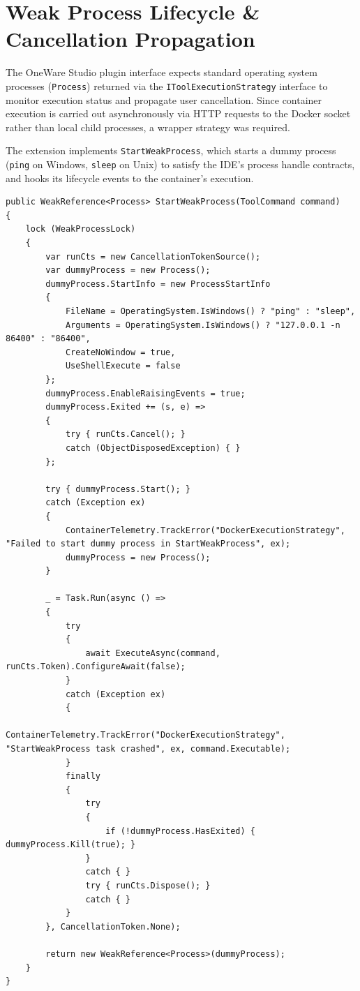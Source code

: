 \section{Weak Process Lifecycle \& Cancellation Propagation}
The OneWare Studio plugin interface expects standard operating system processes (\texttt{Process}) returned via the \texttt{ITool\-Execution\-Strategy} interface to monitor execution status and propagate user cancellation. Since container execution is carried out asynchronously via HTTP requests to the Docker socket rather than local child processes, a wrapper strategy was required.

The extension implements \texttt{StartWeakProcess}, which starts a dummy process (\texttt{ping} on Windows, \texttt{sleep} on Unix) to satisfy the IDE's process handle contracts, and hooks its lifecycle events to the container's execution.

\begin{lstlisting}[language=CSharp, caption={Weak Process Lifecycle Wrapper}, label={lst:weakprocess}]
public WeakReference<Process> StartWeakProcess(ToolCommand command)
{
    lock (WeakProcessLock)
    {
        var runCts = new CancellationTokenSource();
        var dummyProcess = new Process();
        dummyProcess.StartInfo = new ProcessStartInfo
        {
            FileName = OperatingSystem.IsWindows() ? "ping" : "sleep",
            Arguments = OperatingSystem.IsWindows() ? "127.0.0.1 -n 86400" : "86400",
            CreateNoWindow = true,
            UseShellExecute = false
        };
        dummyProcess.EnableRaisingEvents = true;
        dummyProcess.Exited += (s, e) =>
        {
            try { runCts.Cancel(); }
            catch (ObjectDisposedException) { }
        };

        try { dummyProcess.Start(); }
        catch (Exception ex)
        {
            ContainerTelemetry.TrackError("DockerExecutionStrategy", "Failed to start dummy process in StartWeakProcess", ex);
            dummyProcess = new Process();
        }

        _ = Task.Run(async () =>
        {
            try
            {
                await ExecuteAsync(command, runCts.Token).ConfigureAwait(false);
            }
            catch (Exception ex)
            {
                ContainerTelemetry.TrackError("DockerExecutionStrategy", "StartWeakProcess task crashed", ex, command.Executable);
            }
            finally
            {
                try
                {
                    if (!dummyProcess.HasExited) { dummyProcess.Kill(true); }
                }
                catch { }
                try { runCts.Dispose(); }
                catch { }
            }
        }, CancellationToken.None);

        return new WeakReference<Process>(dummyProcess);
    }
}
\end{lstlisting}

